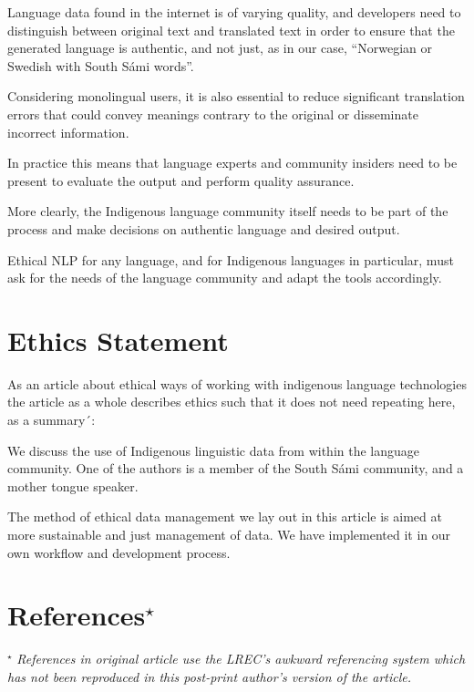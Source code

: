 \documentclass[free]{flammie}
\begin{document}
Language data found in the internet is of varying quality, and developers need
to distinguish between original text and translated text in order to ensure that
the generated language is authentic, and not just, as in our case, ``Norwegian
or Swedish with South Sámi words''.

Considering monolingual users, it is also essential to reduce significant
translation errors that could convey meanings contrary to the original or
disseminate incorrect information.

In practice this means that language experts and community insiders need to be
present to evaluate the output and perform quality assurance.

More clearly, the Indigenous language community itself needs to be part of the
process and make decisions on authentic language and desired output.

Ethical NLP for any language, and for Indigenous languages in particular, must
ask for the needs of the language community and adapt the tools accordingly.

\section*{Ethics Statement}

As an article about ethical ways of working with indigenous language
technologies the article as a whole describes ethics such that it does not need
repeating here, as a summary´:

We discuss the use of Indigenous linguistic data from within the language
community. One of the authors is a member of the South Sámi community, and a
mother tongue speaker.

The method of ethical data management we lay out in this article is aimed at
more sustainable and just management of data. We have implemented it in our own
workflow and development process.

\section*{References$^\star$}\label{sec:reference}

$^\star$ \textit{References in original article use the LREC's awkward
referencing system which has not been reproduced in this post-print author's
version of the article.}



\end{document}
